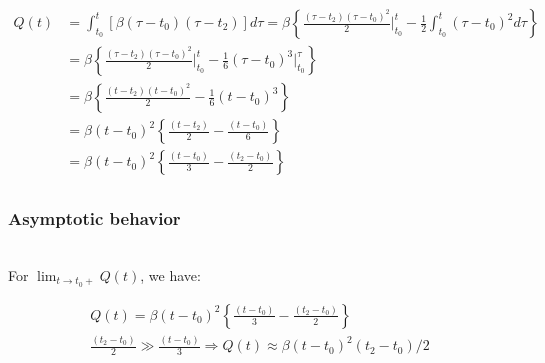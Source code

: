 \documentclass[12pt]{report}
\begin{document}
\begin{equation}
  \label{eq:qt-final}
  \begin{split}
    Q(t) & =\int_{t_0}^t\left[\beta(\tau-t_0)(\tau-t_2)\right]d\tau
    = \beta\left\{\frac{(\tau-t_2)(\tau-t_0)^2}{2}\Biggr\rvert_{t_0}^{t}
      - \frac{1}{2}\int_{t_0}^t(\tau-t_0)^2d\tau\right\}\\
    &= \beta\left\{\frac{(\tau-t_2)(\tau-t_0)^2}{2}\Biggr\rvert_{t_0}^{t}
      - \frac{1}{6}(\tau-t_0)^3\Biggr\rvert_{t_0}^{\tau}\right\}\\ 
    &= \beta\left\{\frac{(t-t_2)(t-t_0)^2}{2}
      - \frac{1}{6}(t-t_0)^3\right\}\\ 
    &= \beta(t-t_0)^2\left\{\frac{(t-t_2)}{2}
      - \frac{(t-t_0)}{6}\right\}\\ 
    &= \beta(t-t_0)^2\left\{\frac{(t-t_0)}{3}
      - \frac{(t_2-t_0)}{2}\right\}\\ 
  \end{split}
\end{equation}

\subsubsection*{Asymptotic behavior}~\\

For \emph{$\lim_{t\to t_0+} Q(t)$}, we have:

\begin{equation}
  \label{eq:qt-asymp-at-t0}
  \begin{split}
    Q(t) = \beta(t-t_0)^2\left\{\frac{(t-t_0)}{3}
      - \frac{(t_2-t_0)}{2}\right\}\\ 
    \frac{(t_2-t_0)}{2} \gg \frac{(t-t_0)}{3} 
    \Rightarrow Q(t) \approx \beta(t-t_0)^2(t_2-t_0)/2
  \end{split}
\end{equation}
\end{document}

